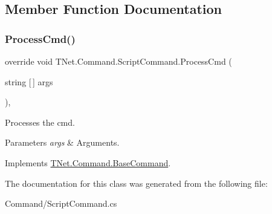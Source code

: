\subsection{Member Function Documentation}
\mbox{\label{class_t_net_1_1_command_1_1_script_command_a69b8d968f851b261e006e233de4ebee0}} 
\subsubsection{\texorpdfstring{Process\+Cmd()}{ProcessCmd()}}
{\footnotesize\ttfamily override void T\+Net.\+Command.\+Script\+Command.\+Process\+Cmd (\begin{DoxyParamCaption}\item[{string \mbox{[}$\,$\mbox{]}}]{args }\end{DoxyParamCaption})\hspace{0.3cm}{\ttfamily [protected]}, {\ttfamily [virtual]}}



Processes the cmd. 


\begin{DoxyParams}{Parameters}
{\em args} & Arguments.\\
\hline
\end{DoxyParams}


Implements \mbox{\hyperlink{class_t_net_1_1_command_1_1_base_command_a7074bfedc9614ab46da40606cfefa4e0}{T\+Net.\+Command.\+Base\+Command}}.



The documentation for this class was generated from the following file\+:\begin{DoxyCompactItemize}
\item 
Command/Script\+Command.\+cs\end{DoxyCompactItemize}
